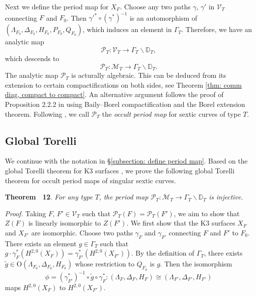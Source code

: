 \documentclass[
]{article}
\begin{document}
Next we define the period map for \(X_F\). Choose any two paths
\(\gamma\), \(\gamma'\) in \(\mathcal{V}_T\) connecting \(F\) and
\(F_0\). Then \(\gamma'^*\circ (\gamma^*)^{-1}\) is an automorphism of
\((\Lambda_{F_0}, \Delta_{F_0}, H_{F_0}, P_{F_0}, Q_{F_0})\), which
induces an element in \(\Gamma_T\). Therefore, we have an analytic map
\[\mathscr{P}_T\colon \mathcal{V}_T\to \Gamma_T\backslash \mathbb{D}_T,\]
which descends to
\[\mathscr{P}_T\colon \mathcal{M}_T\to \Gamma_T\backslash \mathbb{D}_T.\]
The analytic map \(\mathscr{P}_T\) is acturally algebraic. This can be
deduced from its extension to certain compactifications on both sides,
see Theorem \ref{thm: comm diag, compact to compact}. An alternative
argument follows the proof of Proposition 2.2.2 in
\cite{hassett2000special} using Baily--Borel compactification and the
Borel extension theorem. Following \cite{kudla2012occult}, we call
\(\mathscr{P}_T\) the \emph{occult period map} for sextic curves of type
\(T\).

\subsection{Global Torelli}\label{global-torelli}

We continue with the notation in §\ref{subsection: define period map}.
Based on the global Torelli theorem for K3 surfaces
\cite{burns1975torelli}, we prove the following global Torelli theorem
for occult period maps of singular sextic curves.

\textbf{Theorem~ 12}. \emph{\label{theorem: global torelli} For any type
\(T\), the period map
\(\mathscr{P}_T\colon \mathcal{M}_T \to \Gamma_{T}\backslash \mathbb{D}_T\)
is injective.}

\emph{Proof.} Taking \(F\), \(F'\in \mathcal{V}_T\) such that
\(\mathscr{P}_T(F)=\mathscr{P}_T(F')\), we aim to show that \(Z(F)\) is
linearly isomorphic to \(Z(F')\). We first show that the K3 surfaces
\(X_F\) and \(X_{F'}\) are isomorphic. Choose two paths \(\gamma_F\) and
\(\gamma_{F'}\) connecting \(F\) and \(F'\) to \(F_0\). There exists an
element \(g\in \Gamma_{T}\) such that
\(g\cdot\gamma_F^*(H^{2,0}(X_F))=\gamma_{F'}^*(H^{2,0}(X_{F'}))\). By
the definition of \(\Gamma_{T}\), there exists
\(\widetilde{g}\in \mathrm{O}(\Lambda_{F_0}, \Delta_{F_0},H_{F_0})\)
whose restriction to \(Q_{F_0}\) is \(g\). Then the isomorphism
\[\phi=(\gamma_{F'}^*)^{-1}\circ \widetilde{g}\circ \gamma_F^* \colon (\Lambda_F, \Delta_F, H_F)\cong (\Lambda_{F'}, \Delta_{F'}, H_{F'})\]
maps \(H^{2,0}(X_F)\) to \(H^{2,0}(X_{F'})\).
\end{document}
